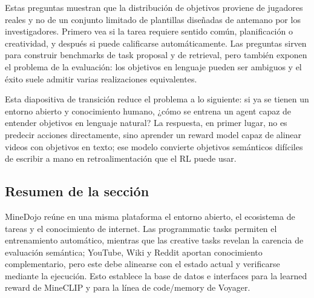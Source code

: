 
Estas preguntas muestran que la distribución de objetivos proviene de jugadores reales y no de un conjunto limitado de plantillas diseñadas de antemano por los investigadores. Primero vea si la tarea requiere sentido común, planificación o creatividad, y después si puede calificarse automáticamente. Las preguntas sirven para construir benchmarks de task proposal y de retrieval, pero también exponen el problema de la evaluación: los objetivos en lenguaje pueden ser ambiguos y el éxito suele admitir varias realizaciones equivalentes.



Esta diapositiva de transición reduce el problema a lo siguiente: si ya se tienen un entorno abierto y conocimiento humano, ¿cómo se entrena un agent capaz de entender objetivos en lenguaje natural? La respuesta, en primer lugar, no es predecir acciones directamente, sino aprender un reward model capaz de alinear videos con objetivos en texto; ese modelo convierte objetivos semánticos difíciles de escribir a mano en retroalimentación que el RL puede usar.

\subsection{Resumen de la sección}

MineDojo reúne en una misma plataforma el entorno abierto, el ecosistema de tareas y el conocimiento de internet. Las programmatic tasks permiten el entrenamiento automático, mientras que las creative tasks revelan la carencia de evaluación semántica; YouTube, Wiki y Reddit aportan conocimiento complementario, pero este debe alinearse con el estado actual y verificarse mediante la ejecución. Esto establece la base de datos e interfaces para la learned reward de MineCLIP y para la línea de code/memory de Voyager.

